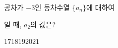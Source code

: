 공차가 $-3$인 등차수열 $\{a_n\}$에 대하여 \par\smallskip{}\par\smallskip\noindent 일 때, $a_2$의 값은?
\begin{choices32}{$17$}{$18$}{$19$}{$20$}{$21$}\end{choices32}
